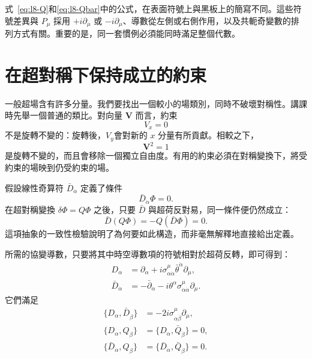 式~\eqref{eq:l8-Q}和\eqref{eq:l8-Qbar}中的公式，在表面符號上與黑板上的簡寫不同。這些符號差異與 \(P_\mu\) 採用 \(+i\partial_\mu\) 或 \(-i\partial_\mu\)、導數從左側或右側作用，以及共軛奇變數的排列方式有關。重要的是，同一套慣例必須能同時滿足整個代數。

\section{在超對稱下保持成立的約束}

一般超場含有許多分量。我們要找出一個較小的場類別，同時不破壞對稱性。講課時先舉一個普通的類比。對向量 \(\mathbf V\) 而言，約束
\begin{equation}
V_x=0
\end{equation}
不是旋轉不變的：旋轉後，\(V_y\)會對新的 \(x\) 分量有所貢獻。相較之下，
\begin{equation}
\mathbf V^2=1
\end{equation}
是旋轉不變的，而且會移除一個獨立自由度。有用的約束必須在對稱變換下，將受約束的場映到仍受約束的場。

假設線性奇算符 \(\bar D_{\dot\alpha}\) 定義了條件
\begin{equation}
\bar D_{\dot\alpha}\Phi=0.
\label{eq:l8-chiral-constraint}
\end{equation}
在超對稱變換 \(\delta\Phi=Q\Phi\) 之後，只要 \(\bar D\) 與超荷反對易，同一條件便仍然成立：
\begin{equation}
\bar D(Q\Phi)=-Q(\bar D\Phi)=0.
\end{equation}
這項抽象的一致性檢驗說明了為何要如此構造，而非毫無解釋地直接給出定義。

\begin{classroomqa}
\end{classroomqa}

所需的協變導數，只要將其中時空導數項的符號相對於超荷反轉，即可得到：
\begin{align}
D_\alpha
&=\partial_\alpha
+i\sigma^\mu_{\alpha\dot\alpha}
\bar\theta^{\dot\alpha}\partial_\mu,
\label{eq:l8-D}\\
\bar D_{\dot\alpha}
&=-\bar\partial_{\dot\alpha}
-i\theta^\alpha\sigma^\mu_{\alpha\dot\alpha}\partial_\mu.
\label{eq:l8-Dbar}
\end{align}
它們滿足
\begin{align}
\{D_\alpha,\bar D_{\dot\beta}\}
&=-2i\sigma^\mu_{\alpha\dot\beta}\partial_\mu,\\
\{D_\alpha,Q_\beta\}
&=\{D_\alpha,\bar Q_{\dot\beta}\}=0,\\
\{\bar D_{\dot\alpha},Q_\beta\}
&=\{\bar D_{\dot\alpha},\bar Q_{\dot\beta}\}=0.
\end{align}

